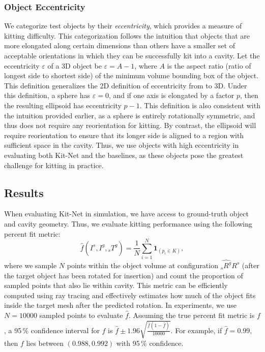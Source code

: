 \subsubsection{Object Eccentricity}
We categorize test objects by their \emph{eccentricity}, which provides a measure of kitting difficulty. This categorization
follows the intuition
that objects that are more elongated along certain dimensions than others have a smaller set of acceptable orientations in which they can be successfully kit into a cavity. Let the eccentricity $\varepsilon$ of a 3D object be $\varepsilon = A - 1$, where $A$ is the aspect ratio (ratio of longest side to shortest side) of the minimum volume bounding box of the object. This definition generalizes the 2D definition of eccentricity from \citet{GoldbergEccentricity2000} to 3D. Under this definition, a sphere has $\varepsilon = 0$, and if one axis is elongated by a factor $p$, then the resulting ellipsoid has eccentricity $p-1$. This definition is also consistent with the intuition provided earlier, as a sphere is entirely rotationally symmetric, and thus does not require any reorientation for kitting. By contrast, the ellipsoid will require reorientation to ensure that its longer side is aligned to a region with sufficient space in the cavity. Thus, we use objects with high eccentricity in evaluating both Kit-Net and the baselines, as these objects pose the greatest challenge for kitting in practice.

\subsection{Results}
\label{subsec:results}
When evaluating Kit-Net in simulation, we have access to ground-truth object and cavity geometry. Thus, we evaluate kitting performance using the following percent fit metric:
\begin{equation}\label{eq:percent-fit}
\hat{f}(I^s, I^g, \hat{{_s}T^g}) = \frac{1}{N} \sum_{i=1}^N \mathbf{1}_{(p_i \in K)},
\end{equation}
where we sample $N$ points within the object volume at configuration $\hat{{_s}R^g}R^s$ (after the target object has been rotated for insertion) and count the proportion of sampled points that also lie within cavity. This metric can be efficiently computed using ray tracing and effectively estimates how much of the object fits inside the target mesh after the predicted rotation.
In experiments, we use $N=10000$ sampled points to evaluate $\hat{f}$. Assuming the true percent fit metric is $f$, a 95\,\% confidence interval for $f$ is $\hat{f} \pm 1.96\sqrt{\frac{\hat{f}(1-\hat{f})}{10000}}$. For example, if $\hat{f} = 0.99$, then $f$ lies between $(0.988, 0.992)$ with 95\,\% confidence. 



